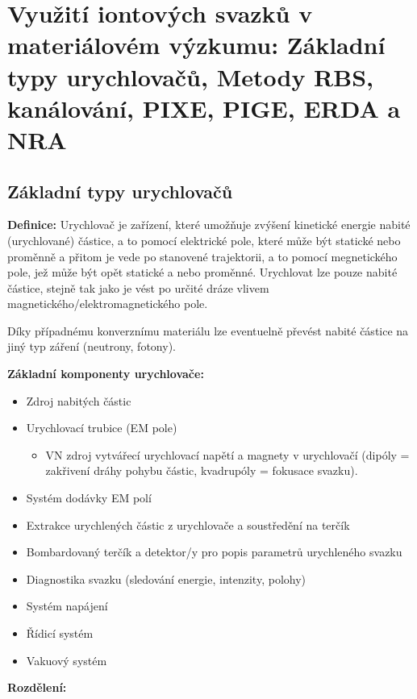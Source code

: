 \section[Využití iontových svazků v materiálovém výzkumu]{Využití iontových svazků v materiálovém výzkumu: Základní typy urychlovačů, Metody RBS, kanálování, PIXE, PIGE, ERDA a NRA}

\subsection{Základní typy urychlovačů}

\textbf{Definice:} Urychlovač je zařízení, které umožňuje zvýšení kinetické energie nabité (urychlované) částice, a to pomocí elektrické pole, které může být statické nebo proměnně a přitom je vede po stanovené trajektorii, a to pomocí megnetického pole, jež může být opět statické a nebo proměnné. Urychlovat lze pouze nabité částice, stejně tak jako je vést po určité dráze vlivem magnetického/elektromagnetického pole.

Díky případnému konverznímu materiálu lze eventuelně převést nabité částice na jiný typ záření (neutrony, fotony).

\textbf{Základní komponenty urychlovače:}

\begin{itemize}
    \item Zdroj nabitých částic
    \item Urychlovací trubice (EM pole)
    \begin{itemize}
        \item VN zdroj vytvářecí urychlovací napětí a magnety v urychlovačí (dipóly = zakřivení dráhy pohybu částic, kvadrupóly = fokusace svazku).
    \end{itemize}
    \item Systém dodávky EM polí
    \item Extrakce urychlených částic z urychlovače a soustředění na terčík
    \item Bombardovaný terčík a detektor/y pro popis parametrů urychleného svazku
    \item Diagnostika svazku (sledování energie, intenzity, polohy)
    \item Systém napájení
    \item Řídicí systém
    \item Vakuový systém
\end{itemize}

\textbf{Rozdělení:}

